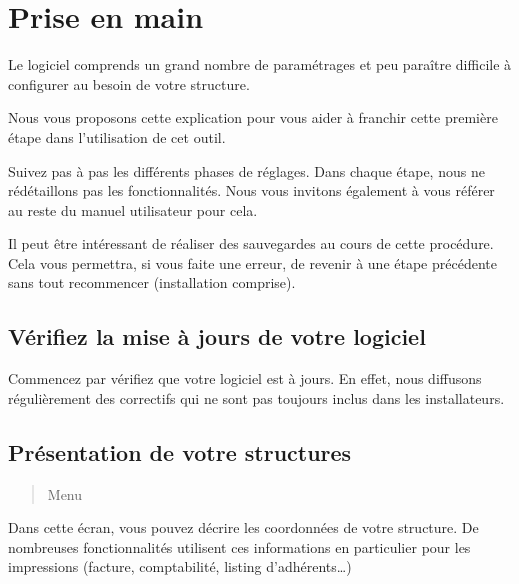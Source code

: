 \documentclass[a4paper,10pt,oneside,french]{sphinxmanual}
\begin{document}
\section{Prise en main}
\label{\detokenize{pro/first_step:prise-en-main}}\label{\detokenize{pro/first_step::doc}}
\sphinxAtStartPar
Le logiciel  comprends un grand nombre de paramétrages et peu paraître difficile à configurer au besoin de votre structure.

\sphinxAtStartPar
Nous vous proposons cette explication pour vous aider à franchir cette première étape dans l’utilisation de cet outil.

\sphinxAtStartPar
Suivez pas à pas les différents phases de réglages. Dans chaque étape, nous ne ré\sphinxhyphen{}détaillons pas les fonctionnalités.
Nous vous invitons également à vous référer au reste du manuel utilisateur pour cela.

\sphinxAtStartPar
Il peut être intéressant de réaliser des sauvegardes au cours de cette procédure.
Cela vous permettra, si vous faite une erreur, de revenir à une étape précédente sans tout recommencer (installation comprise).


\subsection{Vérifiez la mise à jours de votre logiciel}
\label{\detokenize{pro/first_step:verifiez-la-mise-a-jours-de-votre-logiciel}}
\sphinxAtStartPar
Commencez par vérifiez que votre logiciel est à jours.
En effet, nous diffusons régulièrement des correctifs qui ne sont pas toujours inclus dans les installateurs.


\subsection{Présentation de votre structures}
\label{\detokenize{pro/first_step:presentation-de-votre-structures}}\begin{quote}

\sphinxAtStartPar
Menu 
\end{quote}

\sphinxAtStartPar
Dans cette écran, vous pouvez décrire les coordonnées de votre structure.
De nombreuses fonctionnalités utilisent ces informations en particulier pour les impressions (facture, comptabilité, listing d’adhérents…)
\end{document}
